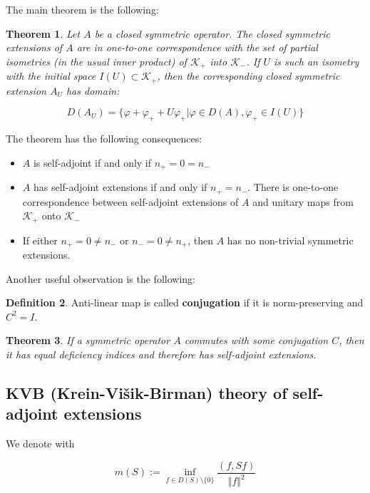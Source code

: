 \documentclass[11pt, a4paper, german]{article}
\theoremstyle{plain}
\newtheorem{theorem}{Theorem}
\theoremstyle{definition}
\newtheorem{definition}[theorem]{Definition}
\theoremstyle{remark}
\numberwithin{equation}{section}
\numberwithin{theorem}{section}
\begin{document}
The main theorem is the following:

\begin{theorem}
Let $A$ be a closed  symmetric operator. The closed symmetric extensions of $A$ are in one-to-one correspondence with the set of partial isometries (in the usual inner product) of $\mathcal{K}_+$ into $\mathcal{K}_-$. If $U$ is such an isometry with the initial space $I(U) \subset \mathcal{K} _+$, then the corresponding closed symmetric extension $A_U$ has domain:

\begin{equation}
D(A_U)=\{\varphi + \varphi_+ + U \varphi_+ | \varphi \in D(A), \varphi_+ \in I(U)\}
\end{equation}

\end{theorem}

The theorem has the following consequences:

\begin{itemize}
\item $A$ is self-adjoint if and only if $n_+ = 0 = n_-$
\item $A$ has self-adjoint extensions if and only if $n_+ = n_-$. There is one-to-one correspondence between self-adjoint extensions of $A$ and unitary maps from $\mathcal{K}_+$ onto $\mathcal{K}_-$
\item If either $n_+ = 0 \neq n_-$ or $n_- = 0 \neq n_+$, then $A$ has no non-trivial symmetric extensions.
\end{itemize}

Another useful observation is the following:    

\begin{definition}
Anti-linear map is called \textbf{conjugation} if it is norm-preserving and $C^2 = I$.
\end{definition}

\begin{theorem}
If a symmetric operator $A$ commutes with some conjugation $C$, then it has equal deficiency indices and therefore has self-adjoint extensions.
\end{theorem}

\subsection{KVB (Krein-Višik-Birman) theory of self-adjoint extensions}

We denote with

$$m(S) := \inf _{f\in D(S)\setminus \{0\}}\frac{(f, Sf)}{\Vert f \Vert ^2}$$ 
\end{document}
